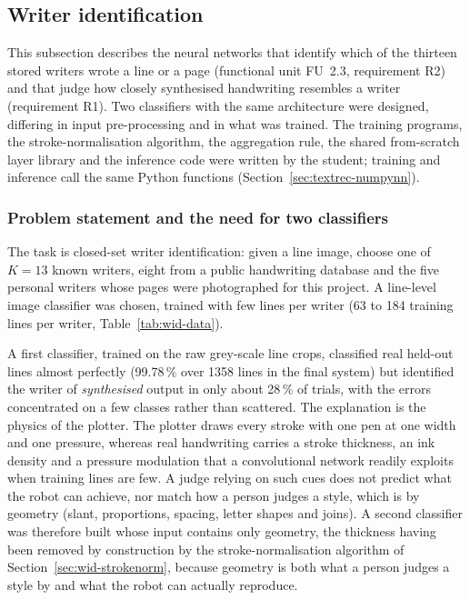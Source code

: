 \subsection{Writer identification}
\label{sec:writerid}

This subsection describes the neural networks that identify which of the thirteen stored writers wrote a line or a page (functional unit FU~2.3, requirement R2) and that judge how closely synthesised handwriting resembles a writer (requirement R1).
Two classifiers with the same architecture were designed, differing in input pre-processing and in what was trained. The training programs, the stroke-normalisation algorithm, the aggregation rule, the shared from-scratch layer library and the inference code were written by the student; training and inference call the same Python functions (Section~\ref{sec:textrec-numpynn}).

\subsubsection{Problem statement and the need for two classifiers}

The task is closed-set writer identification: given a line image, choose one of $K=13$ known writers, eight from a public handwriting database and the five personal writers whose pages were photographed for this project.
A line-level image classifier was chosen, trained with few lines per writer (63 to 184 training lines per writer, Table~\ref{tab:wid-data}).

A first classifier, trained on the raw grey-scale line crops, classified real held-out lines almost perfectly (99.78\,\% over 1358 lines in the final system) but identified the writer of \emph{synthesised} output in only about 28\,\% of trials, with the errors concentrated on a few classes rather than scattered.
The explanation is the physics of the plotter.
The plotter draws every stroke with one pen at one width and one pressure, whereas real handwriting carries a stroke thickness, an ink density and a pressure modulation that a convolutional network readily exploits when training lines are few.
A judge relying on such cues does not predict what the robot can achieve, nor match how a person judges a style, which is by geometry (slant, proportions, spacing, letter shapes and joins).
A second classifier was therefore built whose input contains only geometry, the thickness having been removed by construction by the stroke-normalisation algorithm of Section~\ref{sec:wid-strokenorm}, because geometry is both what a person judges a style by and what the robot can actually reproduce.

